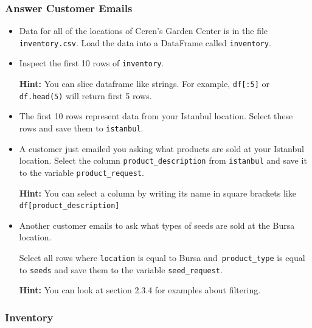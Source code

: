 \documentclass[a4paper]{article}
\begin{document}
\subsubsection{Answer Customer Emails}

\begin{itemize}
\item 
Data for all of the locations of Ceren's Garden Center is in the file \texttt{inventory.csv}. Load the data into a DataFrame called \texttt{inventory}.

\item
Inspect the first 10 rows of \texttt{inventory}.

\textbf{Hint:} You can slice dataframe like strings. For example, \texttt{df[:5]} or \texttt{df.head(5)} will return first 5 rows.

\item
The first 10 rows represent data from your Istanbul location. Select these rows and save them to \texttt{istanbul}.

\item
A customer just emailed you asking what products are sold at your Istanbul location. Select the column \texttt{product\_description} from \texttt{istanbul} and save it to the variable \texttt{product\_request}. 

\textbf{Hint:} You can select a column by writing its name in square brackets like \texttt{df[\textquotesingle product\_description\textquotesingle]}

\item
Another customer emails to ask what types of seeds are sold at the Bursa location.

Select all rows where \texttt{location} is equal to Bursa and\texttt{ product\_type} is equal to \texttt{seeds} and save them to the variable \texttt{seed\_request}. 

\textbf{Hint:} You can look at section 2.3.4 for examples about filtering.
\end{itemize}{}

\subsubsection{Inventory}
\end{document}
